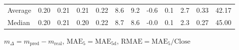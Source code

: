 \begin{threeparttable}
{\begin{tabular}{lrrrrrrrrrrr}
Average &          0.20 &          0.21 &          0.21 &        0.22 &                 8.6 &                 9.2 &       -0.6 &                 0.1 &              2.7 &            0.33 &                  42.17 \\
 Median &          0.20 &          0.21 &          0.20 &        0.22 &                 8.7 &                 8.6 &       -0.0 &                 0.1 &              2.3 &            0.27 &                  45.00 \\
\bottomrule
\end{tabular}
}
\begin{tablenotes}\footnotesize
\item $m_\Delta=m_{\text{pred}}-m_{\text{real}}$,
$\mathrm{MAE}_5=\mathrm{MAE}_{5\text{d}}$,
$\mathrm{RMAE}=\mathrm{MAE}_5/\text{Close}$
\end{tablenotes}
\end{threeparttable}
\endgroup

